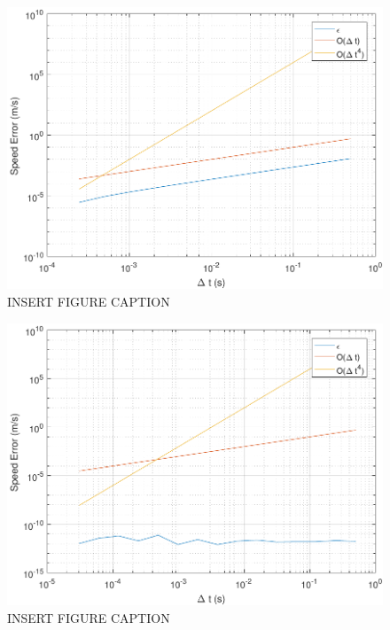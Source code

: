 \begin{figure}[H]
	\centering
	\begin{minipage}{4.5 in}
		\includegraphics[width=\linewidth]{Figures/convtestatmo.pdf}
		\caption{INSERT FIGURE CAPTION \label{fig:convtestatmo} }
	\end{minipage}
\end{figure}



\begin{figure}[H]
	\centering
	\begin{minipage}{4.5 in}
		\includegraphics[width=\linewidth]{Figures/convtestvac.pdf}
		\caption{INSERT FIGURE CAPTION \label{fig:convtestvac} }
	\end{minipage}
\end{figure}



